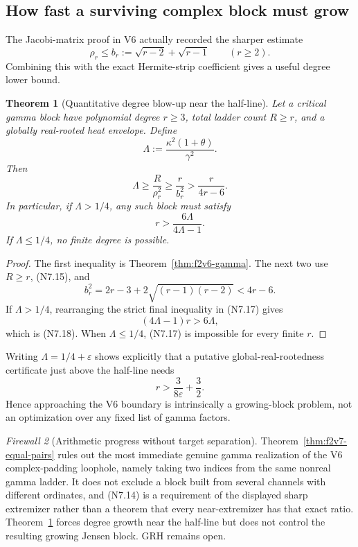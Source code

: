 \documentclass[11pt]{article}
\newtheorem{theorem}{Theorem}[section]
\theoremstyle{definition}
\theoremstyle{remark}
\newtheorem{firewall}[theorem]{Firewall}
\begin{document}
\subsection{How fast a surviving complex block must grow}

The Jacobi-matrix proof in V6 actually recorded the sharper estimate
\[
 \rho_r\le b_r:=
 \sqrt{r-2}+\sqrt{r-1}
 \qquad(r\ge2).
 \tag{N7.15}
\]
Combining this with the exact Hermite-strip coefficient gives a useful
degree lower bound.

\begin{theorem}[Quantitative degree blow-up near the half-line]
\label{thm:f2v7-degree}
Let a critical gamma block have polynomial degree \(r\ge3\), total ladder
count \(R\ge r\), and a globally real-rooted heat envelope.  Define
\[
 \Lambda:=
 \frac{\kappa^2(1+\theta)}{\gamma^2}.
 \tag{N7.16}
\]
Then
\[
 \boxed{
 \Lambda\ge\frac{R}{\rho_r^2}
 \ge\frac{r}{b_r^2}
 >
 \frac{r}{4r-6}.}
 \tag{N7.17}
\]
In particular, if \(\Lambda>1/4\), any such block must satisfy
\[
 \boxed{
 r>\frac{6\Lambda}{4\Lambda-1}.}
 \tag{N7.18}
\]
If \(\Lambda\le1/4\), no finite degree is possible.
\end{theorem}

\begin{proof}
The first inequality is Theorem~\ref{thm:f2v6-gamma}.  The next two use
\(R\ge r\), \textup{(N7.15)}, and
\[
 b_r^2
 =2r-3+2\sqrt{(r-1)(r-2)}
 <4r-6.
 \tag{N7.19}
\]
If \(\Lambda>1/4\), rearranging the strict final inequality in
\textup{(N7.17)} gives
\[
 (4\Lambda-1)r>6\Lambda,
 \tag{N7.20}
\]
which is \textup{(N7.18)}.  When \(\Lambda\le1/4\),
\textup{(N7.17)} is impossible for every finite \(r\).
\end{proof}

Writing \(\Lambda=1/4+\varepsilon\) shows explicitly that a putative
global-real-rootedness certificate just above the half-line needs
\[
 r>\frac{3}{8\varepsilon}+\frac32.
 \tag{N7.21}
\]
Hence approaching the V6 boundary is intrinsically a growing-block problem,
not an optimization over any fixed list of gamma factors.

\begin{firewall}[Arithmetic progress without target separation]
Theorem~\ref{thm:f2v7-equal-pairs} rules out the most immediate genuine
gamma realization of the V6 complex-padding loophole, namely taking two
indices from the same nonreal gamma ladder.  It does not exclude a block
built from several channels with different ordinates, and
\textup{(N7.14)} is a requirement of the displayed sharp extremizer rather
than a theorem that every near-extremizer has that exact ratio.
Theorem~\ref{thm:f2v7-degree} forces degree growth near the half-line but
does not control the resulting growing Jensen block.  GRH remains open.
\end{firewall}
\end{document}
